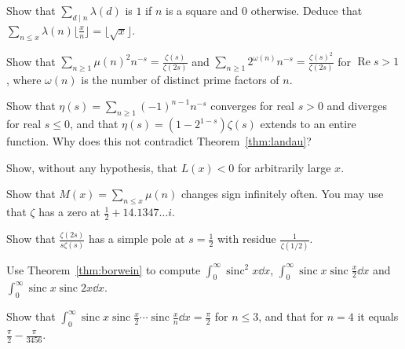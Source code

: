 \begin{exercise}[$\star$]\label{ex:squares}
Show that $\sum_{d\mid n}\lambda(d)$ is $1$ if $n$ is a square and $0$ otherwise. Deduce that $\sum_{n\le x}\lambda(n)\bigl\lfloor\frac xn\bigr\rfloor=\lfloor\sqrt x\rfloor$.
\end{exercise}

\begin{exercise}[$\star$]\label{ex:squarefree}
Show that $\sum_{n\ge1}\mu(n)^2n^{-s}=\frac{\zeta(s)}{\zeta(2s)}$ and $\sum_{n\ge1}2^{\omega(n)}n^{-s}=\frac{\zeta(s)^2}{\zeta(2s)}$ for $\operatorname{Re}s>1$, where
$\omega(n)$ is the number of distinct prime factors of $n$.
\end{exercise}

\begin{exercise}[$\star\star$]\label{ex:etaentire}
Show that $\eta(s)=\sum_{n\ge1}(-1)^{n-1}n^{-s}$ converges for real $s>0$ and diverges for real $s\le0$, and that $\eta(s)=(1-2^{1-s})\zeta(s)$ extends to an entire
function. Why does this not contradict Theorem~\ref{thm:landau}?
\end{exercise}

\begin{exercise}[$\star\star$]\label{ex:Lnegative}
Show, without any hypothesis, that $L(x)<0$ for arbitrarily large $x$.
\end{exercise}

\begin{exercise}[$\star\star$]\label{ex:mertenssign}
Show that $M(x)=\sum_{n\le x}\mu(n)$ changes sign infinitely often. You may use that $\zeta$ has a zero at $\frac12+14.1347\ldots i$.
\end{exercise}

\begin{exercise}[$\star$]\label{ex:residue}
Show that $\frac{\zeta(2s)}{s\zeta(s)}$ has a simple pole at $s=\frac12$ with residue $\frac1{\zeta(1/2)}$.
\end{exercise}

\begin{exercise}[$\star$]\label{ex:sincpairs}
Use Theorem~\ref{thm:borwein} to compute $\int_0^\infty\operatorname{sinc}^2x\dd x$, $\int_0^\infty\operatorname{sinc}x\operatorname{sinc}\frac x2\dd x$ and
$\int_0^\infty\operatorname{sinc}x\operatorname{sinc}2x\dd x$.
\end{exercise}

\begin{exercise}[$\star\star$]\label{ex:harmonicsinc}
Show that $\int_0^\infty\operatorname{sinc}x\operatorname{sinc}\frac x2\cdots\operatorname{sinc}\frac x{n}\dd x=\frac\pi2$ for $n\le3$, and that for $n=4$ it equals
$\frac\pi2-\frac\pi{3456}$.
\end{exercise}

